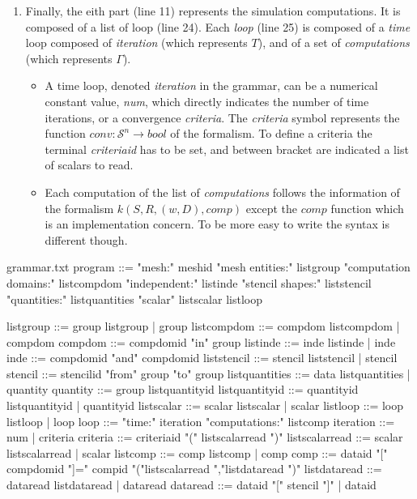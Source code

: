 \begin{enumerate}
\item Finally, the eith part (line 11) represents the simulation computations. It is composed of a list of loop (line 24). Each \textit{loop} (line 25) is composed of a \textit{time} loop composed of \textit{iteration} (which represents $T$), and of a set of \textit{computations} (which represents $\Gamma$).
\begin{itemize}
\item A time loop, denoted \textit{iteration} in the grammar, can be a numerical constant value, \textit{num}, which directly indicates the number of time iterations, or a convergence \textit{criteria}. The \textit{criteria} symbol represents the function $conv:\mathcal{S}^n \rightarrow bool$ of the formalism. To define a criteria the terminal \textit{criteriaid} has to be set, and between bracket are indicated a list of scalars to read.
\item Each computation of the list of \textit{computations} follows the information of the formalism $k(S,R,(w,D),comp)$ except the $comp$ function which is an implementation concern. To be more easy to write the syntax is different though.
\end{itemize}
\end{enumerate}

\begin{filecontents*}{grammar.txt}
program ::= "mesh:" meshid 
            "mesh entities:" listgroup
            "computation domains:" 
                      listcompdom
            "independent:"
                      listinde
            "stencil shapes:"
                      liststencil
            "quantities:" listquantities
            "scalar" listscalar
            listloop

listgroup ::= group listgroup |  group
listcompdom ::= compdom listcompdom |  compdom
compdom ::= compdomid "in" group
listinde ::= inde listinde |  inde
inde ::= compdomid "and" compdomid
liststencil ::= stencil liststencil | stencil
stencil ::= stencilid "from" group "to" group
listquantities ::= data listquantities |  quantity
quantity ::= group listquantityid
listquantityid ::= quantityid listquantityid |  quantityid
listscalar ::= scalar listscalar | scalar
listloop ::= loop listloop | loop
loop ::=  "time:" iteration
          "computations:" listcomp
iteration ::= num | criteria
criteria ::= criteriaid "(" listscalarread ")"
listscalarread ::= scalar listscalarread |  scalar
listcomp ::= comp listcomp |  comp
comp ::= dataid "[" compdomid "]=" compid "({"listscalarread
                                          "},{"listdataread "})"
listdataread ::= dataread listdataread |  dataread
dataread ::= dataid "[" stencil "]" |  dataid
\end{filecontents*}

